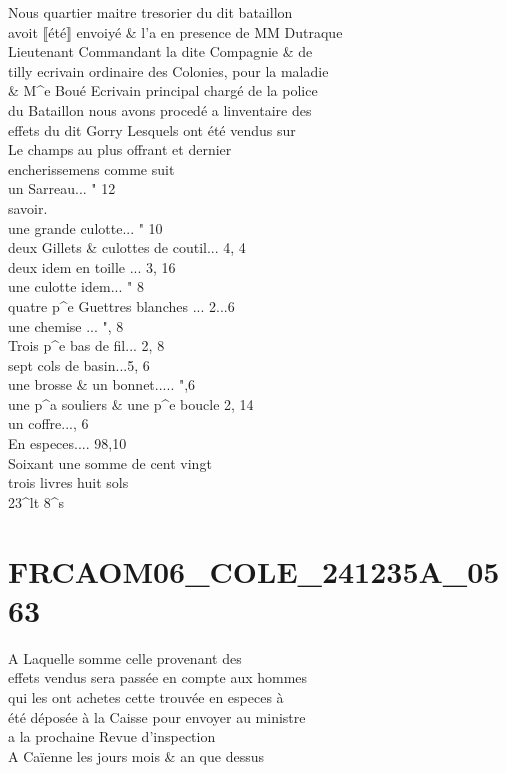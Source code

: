 \documentclass{article}
\begin{document}
\begin{pages}
Nous quartier maitre tresorier du dit bataillon\\
avoit ⟦été⟧ envoiyé \& l'a en presence de MM Dutraque\\
Lieutenant Commandant la dite Compagnie \& de\\
tilly ecrivain ordinaire des Colonies, pour la maladie\\
\& M\^{}e Boué Ecrivain principal chargé de la police\\
du Bataillon nous avons procedé a linventaire des\\
effets du dit Gorry Lesquels ont été vendus sur\\
Le champs au plus offrant et dernier\\
encherissemens comme suit\\
un Sarreau... " 12\\
savoir.\\
une grande culotte... " 10\\
deux Gillets \& culottes de coutil... 4, 4\\
deux idem en toille ... 3, 16\\
une culotte idem... " 8\\
quatre p\^{}e Guettres blanches ... 2...6\\
une chemise ... ", 8\\
Trois p\^{}e bas de fil... 2, 8\\
sept cols de basin...5, 6\\
une brosse \& un bonnet..... ",6\\
une  p\^{}a souliers \& une p\^{}e boucle 2, 14\\
un coffre..., 6\\
En especes.... 98,10\\
Soixant une somme de cent vingt\\
trois livres huit sols\\
23\^{}lt 8\^{}s
\pend
\endnumbering\beginnumbering\section{FRCAOM06\_COLE\_241235A\_0563}\pstart
A Laquelle somme celle provenant des\\
effets vendus sera passée en compte aux hommes\\
qui les ont achetes cette trouvée en especes à\\
été déposée à la Caisse pour envoyer au ministre\\
a la prochaine Revue d'inspection\\
A Caïenne les jours mois \& an que dessus\\

\end{pages}
\end{document}
